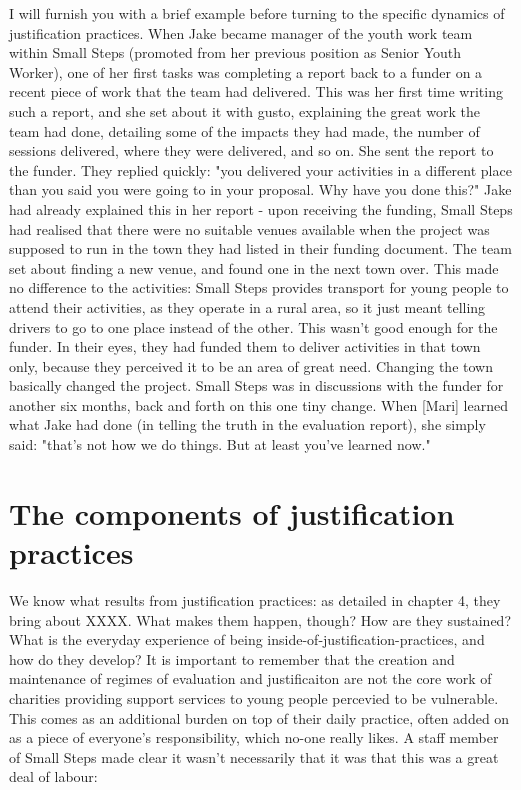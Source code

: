 I will furnish you with a brief example before turning to the specific dynamics of justification practices. When Jake became manager of the youth work team within Small Steps (promoted from her previous position as Senior Youth Worker), one of her first tasks was completing a report back to a funder on a recent piece of work that the team had delivered. This was her first time writing such a report, and she set about it with gusto, explaining the great work the team had done, detailing some of the impacts they had made, the number of sessions delivered, where they were delivered, and so on. She sent the report to the funder. They replied quickly: "you delivered your activities in a different place than you said you were going to in your proposal. Why have you done this?" Jake had already explained this in her report - upon receiving the funding, Small Steps had realised that there were no suitable venues available when the project was supposed to run in the town they had listed in their funding document. The team set about finding a new venue, and found one in the next town over. This made no difference to the activities: Small Steps provides transport for young people to attend their activities, as they operate in a rural area, so it just meant telling drivers to go to one place instead of the other. This wasn't good enough for the funder. In their eyes, they had funded them to deliver activities in that town only, because they perceived it to be an area of great need. Changing the town basically changed the project. Small Steps was in discussions with the funder for another six months, back and forth on this one tiny change. When [Mari] learned what Jake had done (in telling the truth in the evaluation report), she simply said: "that's not how we do things. But at least you've learned now."

\section{The components of justification practices}
We know what results from justification practices: as detailed in chapter 4, they bring about XXXX. What makes them happen, though? How are they sustained? What is the everyday experience of being inside-of-justification-practices, and how do they develop?
It is important to remember that the creation and maintenance of regimes of evaluation and justificaiton are not the core work of charities providing support services to young people percevied to be vulnerable. This comes as an additional burden on top of their daily practice, often added on as a piece of everyone's responsibility, which no-one really likes. A staff member of Small Steps made clear it wasn't necessarily that it was that this was a great deal of labour:

